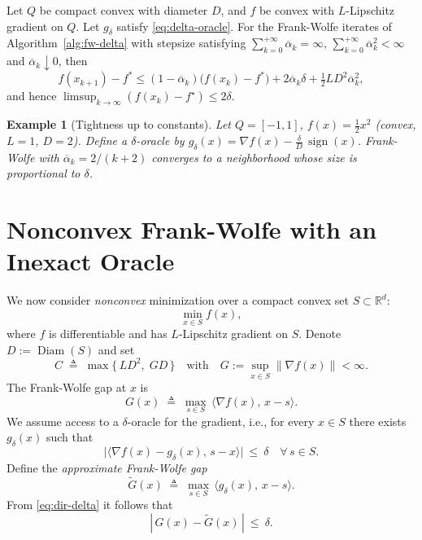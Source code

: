 \documentclass[smallextended]{svjour3}
\newtheorem{eg}[theorem]{Example}
\newcommand{\RR}{\mathbb{R}}
\newcommand{\diam}{\operatorname{Diam}}
\begin{document}
\begin{theorem}\label{thm:delta}
Let $Q$ be compact convex with diameter $D$, and $f$ be convex with $L$-Lipschitz gradient on $Q$. Let $g_\delta$ satisfy \eqref{eq:delta-oracle}. For the Frank-Wolfe iterates of Algorithm~\ref{alg:fw-delta} with stepsize satisfying $\sum_{k=0}^{+\infty}\overline\alpha_k=\infty$, $\sum_{k=0}^{+\infty}\overline\alpha_k^2<\infty$ and $\overline\alpha_k\downarrow 0$, then 
\begin{equation}\label{eq:one-step}
f( x_{k+1}) - f^*\le (1-\overline\alpha_k)\big(f( x_k) - f^*\big)+2\overline\alpha_k\delta+\tfrac{1}{2}LD^2\overline\alpha_k^2,
\end{equation}
and hence $\displaystyle \limsup_{k\to\infty}(f( x_k) - f^\star)\le 2\delta$.
\end{theorem}

\begin{eg}[Tightness up to constants]\label{ex:tight}
Let $Q=[-1,1]$, $f( x)=\tfrac12 x^2$ (convex, $L=1$, $D=2$). Define a $\delta$-oracle by $g_\delta( x)=\nabla f( x)-\tfrac{\delta}{D}\,\operatorname{sign}( x)$. Frank-Wolfe with $\overline\alpha_k=2/(k+2)$ converges to a neighborhood whose size is proportional to $\delta$.
\end{eg}


\section{Nonconvex Frank-Wolfe with an Inexact Oracle}\label{sec:nonconvex-delta}

We now consider \emph{nonconvex} minimization over a compact convex set $S\subset\RR^d$:
\[
\min_{x\in S} f(x),
\]
where $f$ is differentiable and has $L$-Lipschitz gradient on $S$. Denote $D:=\diam(S)$ and set
\[
C \;\triangleq\; \max\{\,L D^2,\; G D\,\}\quad\text{with}\quad G:=\sup_{x\in S}\|\nabla f(x)\|<\infty .
\]
The Frank-Wolfe gap at $x$ is
\[
G(x)\;\triangleq\;\max_{s\in S}\,\langle \nabla f(x),\,x-s\rangle .
\]
We assume access to a $\delta$-oracle for the gradient, i.e., for every $x\in S$ there exists $g_\delta(x)$ such that
\begin{equation}\label{eq:dir-delta}
\big|\langle \nabla f(x)-g_\delta(x),\,s-x\rangle\big|\ \le\ \delta\quad\forall\,s\in S .
\end{equation}
Define the \emph{approximate Frank-Wolfe gap}
\[
\tilde G(x)\;\triangleq\;\max_{s\in S}\,\langle g_\delta(x),\,x-s\rangle .
\]
From \eqref{eq:dir-delta} it follows that
\begin{equation}\label{eq:gaps-close}
|\,G(x)-\tilde G(x)\,|\ \le\ \delta.
\end{equation}
\end{document}
